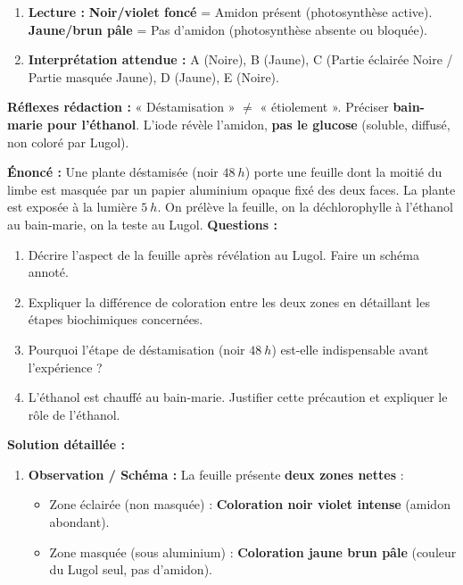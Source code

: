 \documentclass[11pt]{article}
\begin{document}
\begin{methode}
\begin{enumerate}
\begin{enumerate}
            \end{enumerate}
        \item \textbf{Lecture :} \textbf{Noir/violet foncé} = Amidon présent (photosynthèse active). \textbf{Jaune/brun pâle} = Pas d'amidon (photosynthèse absente ou bloquée).
        \item \textbf{Interprétation attendue :} A (Noire), B (Jaune), C (Partie éclairée Noire / Partie masquée Jaune), D (Jaune), E (Noire).
    \end{enumerate}
    \textbf{Réflexes rédaction :} « Déstamisation » $\neq$ « étiolement ». Préciser \textbf{bain-marie pour l'éthanol}. L'iode révèle l'amidon, \textbf{pas le glucose} (soluble, diffusé, non coloré par Lugol).
\end{methode}

\begin{exoresolu}
    \textbf{Énoncé :} Une plante déstamisée (noir $\SI{48}{h}$) porte une feuille dont la moitié du limbe est masquée par un papier aluminium opaque fixé des deux faces. La plante est exposée à la lumière $\SI{5}{h}$. On prélève la feuille, on la déchlorophylle à l'éthanol au bain-marie, on la teste au Lugol.
    \textbf{Questions :}
    \begin{enumerate}
        \item Décrire l'aspect de la feuille après révélation au Lugol. Faire un schéma annoté.
        \item Expliquer la différence de coloration entre les deux zones en détaillant les étapes biochimiques concernées.
        \item Pourquoi l'étape de déstamisation (noir $\SI{48}{h}$) est-elle indispensable avant l'expérience ?
        \item L'éthanol est chauffé au bain-marie. Justifier cette précaution et expliquer le rôle de l'éthanol.
    \end{enumerate}
    \tcblower
    \textbf{Solution détaillée :}
    \begin{enumerate}
        \item \textbf{Observation / Schéma :} La feuille présente \textbf{deux zones nettes} :
            \begin{itemize}
                \item Zone éclairée (non masquée) : \textbf{Coloration noir violet intense} (amidon abondant).
                \item Zone masquée (sous aluminium) : \textbf{Coloration jaune brun pâle} (couleur du Lugol seul, pas d'amidon).

\end{itemize}
\end{enumerate}
\end{exoresolu}
\end{document}
